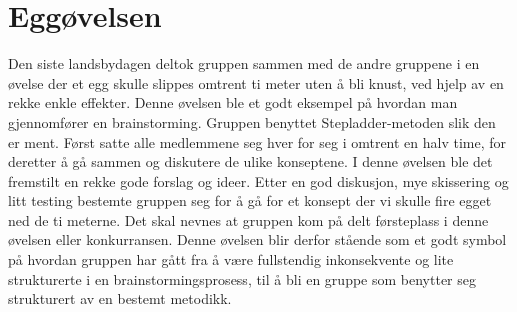 \section{Eggøvelsen}
Den siste landsbydagen deltok gruppen sammen med de andre gruppene i en øvelse der et egg skulle slippes omtrent ti meter uten å bli knust, ved hjelp av en rekke enkle effekter. Denne øvelsen ble et godt eksempel på hvordan man gjennomfører en brainstorming. 
Gruppen benyttet Stepladder-metoden slik den er ment. Først satte alle medlemmene seg hver for seg i omtrent en halv time, for deretter å gå sammen og diskutere de ulike konseptene. I denne øvelsen ble det fremstilt en rekke gode forslag og ideer. Etter en god diskusjon, mye skissering og litt testing bestemte gruppen seg for å gå for et konsept der vi skulle fire egget ned de ti meterne. Det skal nevnes at gruppen kom på delt førsteplass i denne øvelsen eller konkurransen. 
Denne øvelsen blir derfor stående som et godt symbol på hvordan gruppen har gått fra å være fullstendig inkonsekvente og lite strukturerte i en brainstormingsprosess, til å bli en gruppe som benytter seg strukturert av en bestemt metodikk. 


